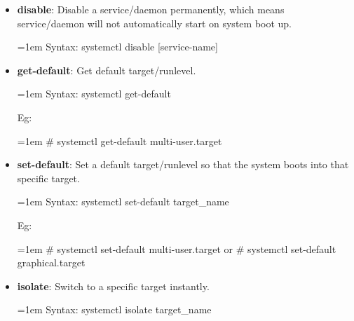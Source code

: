 \begin{flushleft}
\begin{itemize}
\begin{itemize}
		\bigskip
		\bigskip
		
		\item \textbf{disable}: Disable a service/daemon permanently, which means service/daemon will not automatically start on system boot up.
		\bigskip
		\begin{tcolorbox}[breakable,notitle,boxrule=0pt,colback=pink,colframe=pink]
			\color{black}
			\font=1em
			Syntax: systemctl disable  [service-name]
			\font=4pt
		\end{tcolorbox}		

		\bigskip
		\bigskip		
		\item \textbf{get-default}: Get default target/runlevel.
		\begin{tcolorbox}[breakable,notitle,boxrule=0pt,colback=pink,colframe=pink]
			\color{black}
			\font=1em
			Syntax: systemctl get-default
			\font=4pt
		\end{tcolorbox}
		
		Eg:
		\begin{tcolorbox}[breakable,notitle,boxrule=-0pt,colback=black,colframe=black]
			\color{green}
			\font=1em
			\# systemctl get-default
			\newline
			\color{white}
			multi-user.target
			\font=4pt
		\end{tcolorbox}

		\newpage
		\item \textbf{set-default}: Set a default target/runlevel so that the system boots into that specific target.
		\begin{tcolorbox}[breakable,notitle,boxrule=0pt,colback=pink,colframe=pink]
			\color{black}
			\font=1em
			Syntax: systemctl set-default target\_name
			\font=4pt
		\end{tcolorbox}
		
		Eg:
		\begin{tcolorbox}[breakable,notitle,boxrule=-0pt,colback=black,colframe=black]
			\color{green}
			\font=1em
			\# systemctl set-default multi-user.target
			\newline
			or
			\newline
			\# systemctl set-default graphical.target
			\font=4pt
		\end{tcolorbox}
	
		\bigskip
		\bigskip
		\item \textbf{isolate}: Switch to a specific target instantly.
		\begin{tcolorbox}[breakable,notitle,boxrule=0pt,colback=pink,colframe=pink]
			\color{black}
			\font=1em
			Syntax: systemctl isolate target\_name
			\font=4pt
		\end{tcolorbox}
		

\end{itemize}
\end{itemize}
\end{flushleft}
